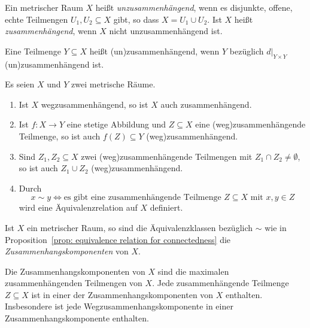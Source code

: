 \begin{definition}
  Ein metrischer Raum $X$ heißt \emph{unzusammenhängend}, wenn es disjunkte, offene, echte Teilmengen $U_1, U_2 \subseteq X$ gibt, so dass $X = U_1 \cup U_2$.
  Ist $X$ heißt \emph{zusammenhängend}, wenn $X$ nicht unzusammenhängend ist.
  
  Eine Teilmenge $Y \subseteq X$ heißt (un)zusammenhängend, wenn $Y$ bezüglich $d|_{Y \times Y}$ (un)zu\-sammenhängend ist.
\end{definition}


\begin{proposition}\label{prop: equivalence relation for connectedness}
  Es seien $X$ und $Y$ zwei metrische Räume.
  \begin{enumerate}[leftmargin=*, label=\roman*)]
    \item
      Ist $X$ wegzusammenhängend, so ist $X$ auch zusammenhängend.
    \item
      Ist $f \colon X \to Y$ eine stetige Abbildung und $Z \subseteq X$ eine (weg)zusammenhängende Teilmenge, so ist auch $f(Z) \subseteq Y$ (weg)zusammenhängend.
    \item
      Sind $Z_1, Z_2 \subseteq X$ zwei (weg)zusammenhängende Teilmengen mit $Z_1 \cap Z_2 \neq \emptyset$, so ist auch $Z_1 \cup Z_2$ (weg)zusammenhängend.
    \item
      Durch
      \[
        x \sim y
        \iff
        \text{es gibt eine zusammenhängende Teilmenge $Z \subseteq X$ mit $x, y \in Z$}
      \]
      wird eine Äquivalenzrelation auf $X$ definiert.
  \end{enumerate}
\end{proposition}


\begin{definition}
  Ist $X$ ein metrischer Raum, so sind die Äquivalenzklassen bezüglich $\sim$ wie in Proposition~\ref{prop: equivalence relation for connectedness} die \emph{Zusammenhangskomponenten} von $X$.
\end{definition}


\begin{remark}
  Die Zusammenhangskomponenten von $X$ sind die maximalen zusammenhängenden Teilmengen von $X$.
  Jede zusammenhängende Teilmenge $Z \subseteq X$ ist in einer der Zusammenhangskomponenten von $X$ enthalten.
  Insbesondere ist jede Wegzusammenhangskomponente in einer Zusammenhangskomponente enthalten.
\end{remark}










